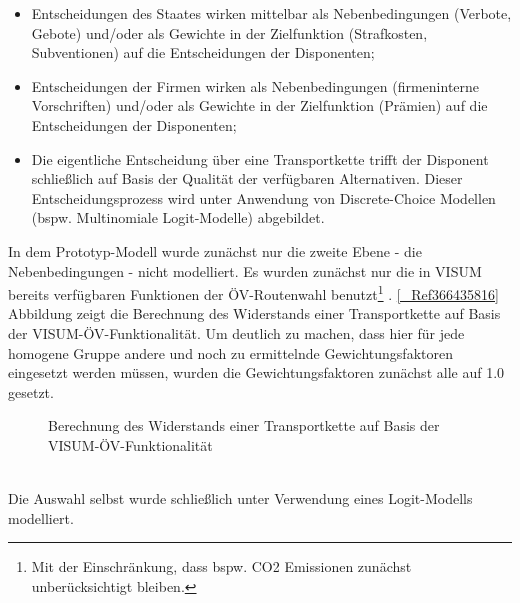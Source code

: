 \begin{itemize}
%
   \item Entscheidungen des Staates wirken mittelbar als Nebenbedingungen\emph{ }(Verbote, Gebote) und/oder als Gewichte in der Zielfunktion (Strafkosten, Subventionen)  auf die Entscheidungen der Disponenten;
   \item Entscheidungen der Firmen wirken als Nebenbedingungen (firmeninterne Vorschriften) und/oder als Gewichte in der Zielfunktion (Prämien) auf die Entscheidungen der Disponenten;
   \item Die eigentliche Entscheidung über eine Transportkette trifft der Disponent schließlich auf Basis der Qualität der verfügbaren Alternativen. Dieser Entscheidungsprozess wird unter Anwendung von Discrete-Choice Modellen (bspw. Multinomiale Logit-Modelle) abgebildet.
%
\end{itemize}
In dem Prototyp-Modell wurde zunächst nur die zweite Ebene - die Nebenbedingungen - nicht modelliert. Es wurden zunächst nur die in VISUM bereits verfügbaren Funktionen der ÖV-Routenwahl benutzt\footnote{%
 Mit der Einschränkung, dass bspw. CO2 Emissionen zunächst unberücksichtigt bleiben.
}%
. \autoref{_Ref366435816} Abbildung  zeigt die Berechnung des Widerstands einer Transportkette auf Basis der VISUM-ÖV-Funktionalität. Um deutlich zu machen, dass hier für jede homogene Gruppe andere und noch zu ermittelnde Gewichtungsfaktoren eingesetzt werden müssen, wurden die Gewichtungsfaktoren zunächst alle auf 1.0 gesetzt.~\\

\begin{figure}[htbp]
  \centering
  \caption{ Berechnung des Widerstands einer Transportkette auf Basis der VISUM-ÖV-Funktionalität}
  \label{_Ref366435816}
\end{figure}
~\\
Die Auswahl selbst wurde schließlich unter Verwendung eines Logit-Modells modelliert. ~\\


% 
